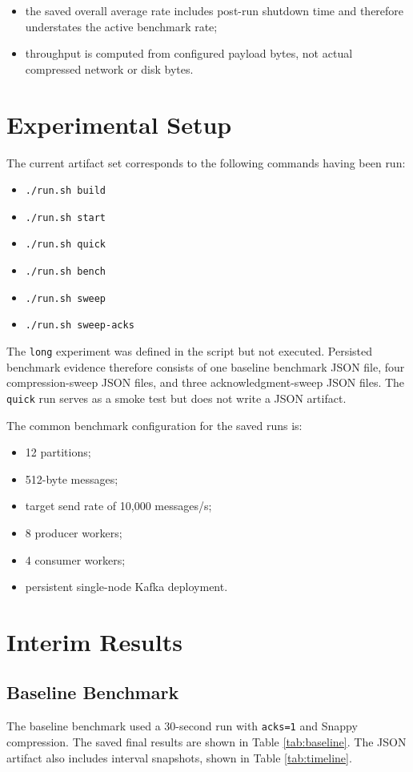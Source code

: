 \documentclass[conference]{IEEEtran}
\begin{document}
\begin{itemize}
\item the saved overall average rate includes post-run shutdown time and therefore understates the active benchmark rate;
\item throughput is computed from configured payload bytes, not actual compressed network or disk bytes.
\end{itemize}

\section{Experimental Setup}
The current artifact set corresponds to the following commands having been run:

\begin{itemize}
\item \texttt{./run.sh build}
\item \texttt{./run.sh start}
\item \texttt{./run.sh quick}
\item \texttt{./run.sh bench}
\item \texttt{./run.sh sweep}
\item \texttt{./run.sh sweep-acks}
\end{itemize}

The \texttt{long} experiment was defined in the script but not executed. Persisted benchmark evidence therefore consists of one baseline benchmark JSON file, four compression-sweep JSON files, and three acknowledgment-sweep JSON files. The \texttt{quick} run serves as a smoke test but does not write a JSON artifact.

The common benchmark configuration for the saved runs is:

\begin{itemize}
\item 12 partitions;
\item 512-byte messages;
\item target send rate of 10{,}000 messages/s;
\item 8 producer workers;
\item 4 consumer workers;
\item persistent single-node Kafka deployment.
\end{itemize}

\section{Interim Results}
\subsection{Baseline Benchmark}
The baseline benchmark used a 30-second run with \texttt{acks=1} and Snappy compression. The saved final results are shown in Table \ref{tab:baseline}. The JSON artifact also includes interval snapshots, shown in Table \ref{tab:timeline}.
\end{document}
